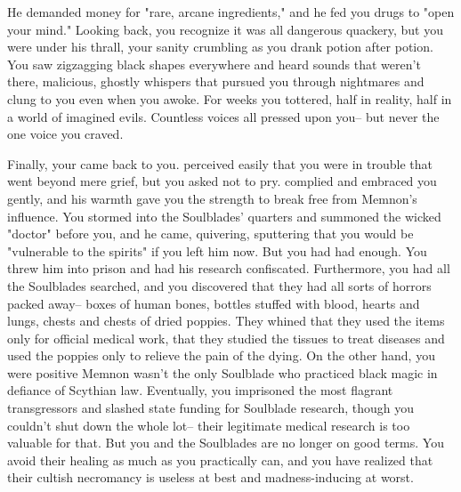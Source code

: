 \documentclass[char]{Kos}
\begin{document}
He demanded money for "rare, arcane ingredients," and he fed you drugs to "open your mind." Looking back, you recognize it was all dangerous quackery, but you were under his thrall, your sanity crumbling as you drank potion after potion. You saw zigzagging black shapes everywhere and heard sounds that weren't there, malicious, ghostly whispers that pursued you through nightmares and clung to you even when you awoke. For weeks you tottered, half in reality, half in a world of imagined evils. Countless voices all pressed upon you-- but never the one voice you craved.

Finally, your \cScythiaKing{\spouse} came back to you. \cScythiaKing{\They} perceived easily that you were in trouble that went beyond mere grief, but you asked \cScythiaKing{\them} not to pry. \cScythiaKing{\They} complied and embraced you gently, and his warmth gave you the strength to break free from Memnon's influence. You stormed into the Soulblades' quarters and summoned the wicked "doctor" before you, and he came, quivering, sputtering that you would be "vulnerable to the spirits" if you left him now. But you had had enough. You threw him into prison and had his research confiscated. Furthermore, you had all the Soulblades searched, and you discovered that they had all sorts of horrors packed away-- boxes of human bones, bottles stuffed with blood, hearts and lungs, chests and chests of dried poppies. They whined that they used the items only for official medical work, that they studied the tissues to treat diseases and used the poppies only to relieve the pain of the dying. On the other hand, you were positive Memnon wasn't the only Soulblade who practiced black magic in defiance of Scythian law. Eventually, you imprisoned the most flagrant transgressors and slashed state funding for Soulblade research, though you couldn't shut down the whole lot-- their legitimate medical research is too valuable for that. But you and the Soulblades are no longer on good terms. You avoid their healing as much as you practically can, and you have realized that their cultish necromancy is useless at best and madness-inducing at worst.
\end{document}

